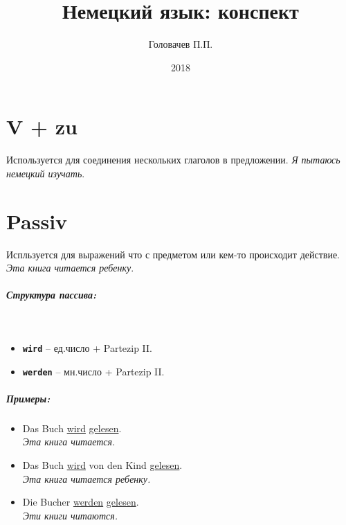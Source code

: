 \documentclass[a4paper,10pt]{report}
\title{Немецкий язык: конспект}
\date{2018}
\author{Головачев П.П.}
\newcommand{\term}[1]{\texttt{\textbf{#1}}}
\newcommand{\satzew}[1]{\underline{#1}}
\newcommand{\ubersatze}[1]{\textit{#1}}
\begin{document}
\tableofcontents


\newpage

\newpage

\chapter{V + zu}

Используется для соединения нескольких глаголов в предложении. \ubersatze{Я пытаюсь немецкий изучать}.

\chapter{Passiv}

Испльзуется для выражений что с предметом или кем-то происходит действие. \ubersatze{Эта книга читается ребенку}.

\paragraph{Структура пассива:} ~\\
\begin{itemize}
\item \term{wird} -- ед.число + Partezip II.
\item \term{werden} -- мн.число + Partezip II.
\end{itemize}

\paragraph{Примеры:}
\begin{itemize}
\item Das Buch \satzew{wird} \satzew{gelesen}.
~\\ \ubersatze{Эта книга читается.}
\item Das Buch \satzew{wird} von den Kind \satzew{gelesen}.
~\\ \ubersatze{Эта книга читается ребенку.}
\item Die Bucher \satzew{werden} \satzew{gelesen}.
~\\ \ubersatze{Эти книги читаются.}
\end{itemize}
\end{document}
